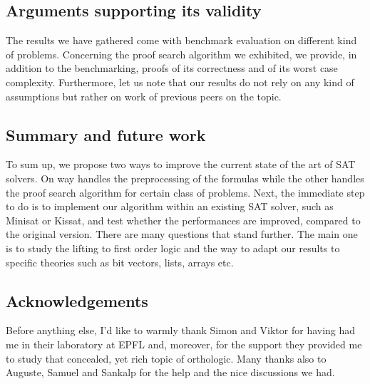\documentclass[a4paper, 11pt]{article}
\begin{document}


	\subsection*{Arguments supporting its validity}
	The results we have gathered come with benchmark evaluation on different kind of problems.
	Concerning the proof search algorithm we exhibited, we provide, in addition to the benchmarking, 
	proofs of its correctness and of its worst case complexity. Furthermore, let us note that our
	results do not rely on any kind of assumptions but rather on work of previous peers on the topic.



	\subsection*{Summary and future work}
	To sum up, we propose two ways to improve the current state of the art of SAT solvers. 
	On way handles the preprocessing of the formulas while the other handles the proof search
	algorithm for certain class of problems. Next, the immediate step to do is
	to implement our algorithm within an existing SAT solver, such as Minisat or Kissat, and test
	whether the performances are improved, compared to the original version. There are many questions
	that stand further. The main one is to study the lifting to first order logic and the way to 
	adapt our results to specific theories such as bit vectors, lists, arrays etc.


	\subsection*{Acknowledgements}
	Before anything else, I'd like to warmly thank Simon and Viktor for having had me in their 
	laboratory at EPFL and, moreover, for the support they provided me to study that concealed, yet
	rich topic of orthologic. Many thanks also to Auguste, Samuel and Sankalp for the help and 
	the nice discussions we had.
\end{document}
